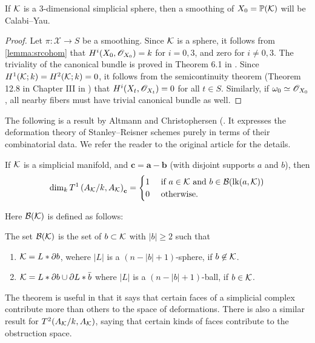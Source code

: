 \begin{lemma}
If $\mathcal{K}$ is a 3-dimensional simplicial sphere, then a smoothing of $X_0=\mathbb{P}(\mathcal{K})$ will be Calabi--Yau.
\end{lemma}
\begin{proof}
Let $\pi:\mathscr X \to S$ be a smoothing. Since $\mathcal{K}$ is a sphere, it follows from \cref{lemma:srcohom} that $H^i(X_0,\mathscr{O}_{X_0})=k$ for $i=0,3$, and zero for $i \neq 0,3$. The triviality of the canonical bundle is proved in Theorem 6.1 in \cite{eisenbud_graphcurves}. Since $H^1(\mathcal{K};k)=H^2(\mathcal{K};k)=0$, it follows from the semicontinuity theorem (Theorem 12.8 in Chapter III in \cite{hartshorne}) that $H^i(X_t,\mathscr{O}_{X_t})=0$ for all $t \in S$. Similarly, if $\omega_0 \simeq \mathscr{O}_{X_0}$, all nearby fibers must have trivial canonical bundle as well.
\end{proof}

The following is a result by Altmann and Christophersen (\cite[Theorem 4.6]{deforming_christophersen}. It expresses the deformation theory of Stanley--Reisner schemes purely in terms of their combinatorial data. We refer the reader to the original article for the details.

\begin{theorem}
\label{thm:t1dims}
If $\mathcal{K}$ is a simplicial manifold, and $\mathbf c = \mathbf a - \mathbf b$ (with disjoint supports $a$ and $b$), then
$$
\dim_k T^1\left(A_{\mathcal{K}}/k,A_{\mathcal{K}} \right)_{\mathbf c} = \begin{cases}
1 & \text{ if } a  \in \mathcal{K} \text{ and } b \in \mathcal B(\mathrm{lk}(a,\mathcal{K})) \\
0 & \text{ otherwise.}
\end{cases}
$$
\end{theorem}
Here $\mathcal B(\mathcal{K})$ is defined as follows:
\begin{definition}
The set $\mathcal B(\mathcal{K})$ is the set of $b \subset \mathcal{K}$ with $|b| \geq 2$ such that
\begin{enumerate}
	\item $\mathcal{K} = L \ast \partial b$, wehere $|L|$ is a $(n-|b|+1)$-sphere, if $b \not \in \mathcal{K}$.
	\item $\mathcal{K} = L \ast \partial b \cup \partial L \ast \bar{b}$ where $|L|$ is a $(n-|b|+1)$-ball, if $b \in \mathcal{K}$.
\end{enumerate}
\end{definition}

The theorem is useful in that it says that certain faces of a simplicial complex contribute more than others to the space of deformations. There is also a similar result for $T^2(A_{\mathcal{K}}/k,A_{\mathcal{K}})$, saying that certain kinds of faces contribute to the obstruction space.

